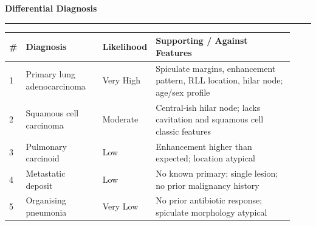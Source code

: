 \documentclass[11pt,a4paper]{article}
\newcommand{\subsectionrule}{%
  \vspace{1pt}%
  {\color{RadRule}\rule{\linewidth}{0.5pt}}%
  \vspace{3pt}%
}
\begin{document}
\begin{tcolorbox}[slatebox]
\noindent\textbf{\color{RadBlue}\faBalanceScale\hspace{4pt}Differential Diagnosis}
\vspace{5pt}

\subsectionrule{}

\small
\renewcommand{\arraystretch}{1.35}
\begin{tabular}{@{}p{0.03\linewidth}p{0.27\linewidth}p{0.14\linewidth}p{0.49\linewidth}@{}}
  \toprule
  \textbf{\#} & \textbf{Diagnosis} & \textbf{Likelihood} & \textbf{Supporting / Against Features} \\
  \midrule{}
  1 & Primary lung adenocarcinoma & Very High & Spiculate margins, enhancement pattern, RLL location, hilar node; age/sex profile \\
  \rowcolor{RadBg}
  2 & Squamous cell carcinoma & Moderate & Central-ish hilar node; lacks cavitation and squamous cell classic features \\
  3 & Pulmonary carcinoid & Low & Enhancement higher than expected; location atypical \\
  \rowcolor{RadBg}
  4 & Metastatic deposit & Low & No known primary; single lesion; no prior malignancy history \\
  5 & Organising pneumonia & Very Low & No prior antibiotic response; spiculate morphology atypical \\
  \bottomrule
\end{tabular}
\end{tcolorbox}

\vspace{8pt}
\end{document}
